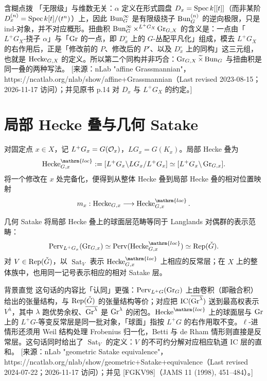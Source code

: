 \begin{transnote}{含糊点拨}
「无限级」与维数无关：$\alpha$ 定义在形式圆盘 $D_x=\operatorname{Spec} k[[t]]$（而非某阶 $D_x^{(n)}=\operatorname{Spec} k[t]/(t^n)$）上，因此 $\operatorname{Bun}_G^\infty$ 是有限级挠子 $\operatorname{Bun}_G^{(n)}$ 的逆向极限，只是 ind-对象，并不对应概形。扭曲积 $\operatorname{Bun}_G^\infty\times^{L^+G_X}\operatorname{Gr}_{G,X}$ 的含义是：一点由「$L^+G_X$-挠子 $\alpha$」与「$\operatorname{Gr}$ 的一点，即 $D_x^\circ$ 上的 $G$-丛配平凡化」组成，模去 $L^+G_X$ 的右作用后，正是「修改前的 $P$、修改后的 $P'$、以及 $D_x^\circ$ 上的同构」这三元组，也就是 $\operatorname{Hecke}_{G,X}$ 的定义。所以第二个同构并非巧合：$\operatorname{Gr}_{G,X}\widetilde\times\operatorname{Bun}_G$ 与扭曲积是同一叠的两种写法。
[来源：nLab "affine Grassmannian"，https://ncatlab.org/nlab/show/affine+Grassmannian（Last revised 2023-08-15；2026-11-17 访问）；并见原书 p.14 对 $D_x$ 与 $L^+G_X$ 的约定。]
\end{transnote}
\section{局部 Hecke 叠与几何 Satake}\label{sec:2.5}
对固定点 $x\in X$，记 $L^+G_x=G(\mathcal{O}_x)$，$LG_x=G(K_x)$。局部 Hecke 叠为
\[\Hecke_{G,x}^{\mathrm{loc}}:=[L^+G_x\backslash LG_x/L^+G_x]\simeq[L^+G_x\backslash\Gr_{G,x}].\]
将一个修改在 $x$ 处完备化，便得到从整体 Hecke 叠到局部 Hecke 叠的相对位置映射
\[m_x:\Hecke_{G,x}\longrightarrow\Hecke_{G,x}^{\mathrm{loc}}.\]

几何 Satake 将局部 Hecke 叠上的球面层范畴等同于 Langlands 对偶群的表示范畴：
\[\operatorname{Perv}_{L^+G_x}(\Gr_{G,x})\simeq\operatorname{Perv}(\Hecke_{G,x}^{\mathrm{loc}})\simeq\Rep(\checkG).\]
对 $V\in\operatorname{Rep}(\check{G})$，以 $\operatorname{Sat}_V$ 表示 $\Hecke_{G,x}^{\mathrm{loc}}$ 上相应的反常层；在 $X$ 上的整体族中，也用同一记号表示相应的相对 Satake 层。

\begin{transnote}{背景直觉}
这句话的内容比「认同」更强：$\operatorname{Perv}_{L^+G}(\operatorname{Gr}_G)$ 上由卷积（即融合积）给出的张量结构，与 $\operatorname{Rep}(\check{G})$ 的张量结构等价；对应把 $\operatorname{IC}(\overline{\operatorname{Gr}^\lambda})$ 送到最高权表示 $V^\lambda$，其中 $\lambda$ 跑优势余权、$\overline{\operatorname{Gr}^\lambda}$ 是 $\operatorname{Gr}^\lambda$ 的闭包。$\Hecke^{\mathrm{loc}}$ 上的球面层与 $\operatorname{Gr}$ 上的 $L^+G$-等变反常层是同一批对象，「球面」指按 $L^+G$ 的右作用取不变。$\ell$-进情形还须用 Weil 结构处理 Frobenius 归一化，Betti 与 de Rham 情形则直接是反常层。这句话同时给出了 $\operatorname{Sat}_V$ 的定义：$V$ 的不可约分解对应相应轨道 IC 层的直和。
[来源：nLab "geometric Satake equivalence"，https://ncatlab.org/nlab/show/geometric+Satake+equivalence（Last revised 2024-07-22；2026-11-17 访问）；并见 [FGKV98]（JAMS 11 (1998), 451–484）。]
\end{transnote}
